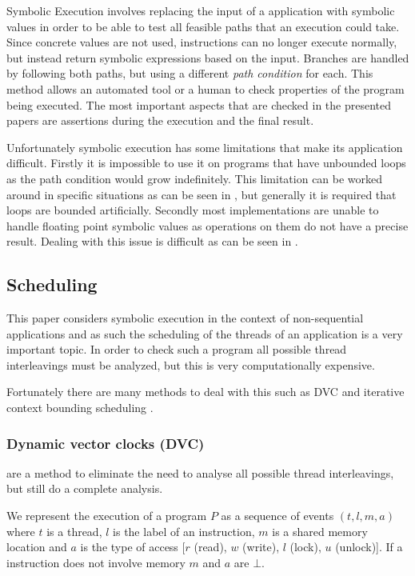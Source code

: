 \documentclass[10pt]{llncs}
\begin{document}
Symbolic Execution involves replacing the input of a application with symbolic values in order to be able to test all feasible paths that an execution could take. Since concrete values are not used, instructions can no longer execute normally, but instead return symbolic expressions based on the input. Branches are handled by following both paths, but using a different \emph{path condition} for each. This method allows an automated tool or a human to check properties of the program being executed. The most important aspects that are checked in the presented papers are assertions during the execution and the final result.

Unfortunately symbolic execution has some limitations that make its application difficult. Firstly it is impossible to use it on programs that have unbounded loops as the path condition would grow indefinitely. This limitation can be worked around in specific situations as can be seen in \cite{base5}, but generally it is required that loops are bounded artificially. Secondly most implementations are unable to handle floating point symbolic values as operations on them do not have a precise result. Dealing with this issue is difficult as can be seen in \cite{base1}.

\subsection{Scheduling}

This paper considers symbolic execution in the context of non-sequential applications and as such the scheduling of the threads of an application is a very important topic. In order to check such a program all possible thread interleavings must be analyzed, but this is very computationally expensive. 

Fortunately there are many methods to deal with this such as DVC \cite{dvc} and iterative context bounding scheduling \cite{musuvathi2007iterative}.

\subsubsection{Dynamic vector clocks (DVC)} are a method to eliminate the need to analyse all possible thread interleavings, but still do a complete analysis.

We represent the execution of a program $P$ as a sequence of events $(t, l, m, a)$ where $t$ is a thread, $l$ is the label of an instruction, $m$ is a shared memory location and $a$ is the type of access [$r$ (read), $w$ (write), $l$ (lock), $u$ (unlock)]. If a instruction does not involve memory $m$ and $a$ are $\bot$.
\end{document}
